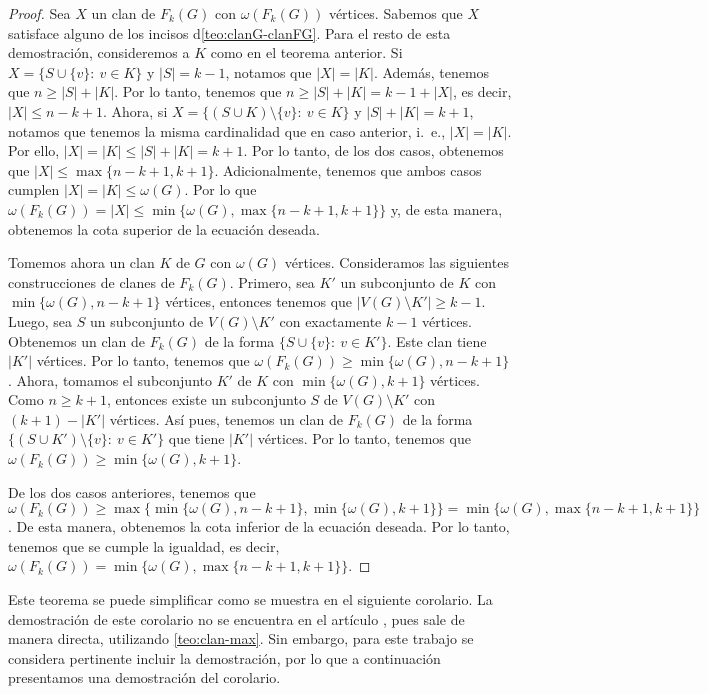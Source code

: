 \begin{proof}
    Sea $X$ un clan de $F_k(G)$ con $\omega(F_k(G))$ v\'ertices. Sabemos que $X$
    satisface alguno de los incisos d\cref{teo:clanG-clanFG}. Para el resto de
    esta demostraci\'on, consideremos a $K$ como en el teorema anterior.   Si $X
    = \{S \cup \{v\} \colon\ v \in K\}$ y $|S| = k-1$, notamos que $|X| = |K|$.
    Adem\'as, tenemos que $n \geq |S| + |K|$. Por lo tanto, tenemos que $n \geq
    |S| + |K| = k-1 + |X|$, es decir, $|X| \leq n-k+1$. Ahora, si $X = \{(S\cup
    K) \setminus \{v\} \colon\ v \in K \}$ y $|S| + |K| = k+1$, notamos que
    tenemos la misma cardinalidad que en caso anterior, i.~e., $|X| =|K|$. Por
    ello, $|X| = |K| \leq |S| + |K| = k+1$. Por lo tanto, de los dos casos,
    obtenemos que $|X| \leq \max\{n-k+1, k+1\}$. Adicionalmente, tenemos que
    ambos casos cumplen $|X| = |K| \leq \omega(G)$. Por lo que $\omega(F_k(G)) =
    |X| \leq \min \{\omega(G), \max \{n-k+1, k+1\}\}$ y, de esta manera,
    obtenemos la cota superior de la ecuaci\'on deseada.

    Tomemos ahora un clan $K$ de $G$ con $\omega(G)$ v\'ertices. Consideramos
    las siguientes construcciones de clanes de $F_k(G)$. Primero, sea $K'$ un
    subconjunto de $K$ con $\min\{\omega(G),n-k+1\}$ v\'ertices, entonces
    tenemos que $|V(G) \setminus K'| \geq k-1$. Luego, sea $S$ un subconjunto de
    $V(G) \setminus K'$ con exactamente $k-1$ v\'ertices. Obtenemos un clan de
    $F_k(G)$ de la forma $\{ S \cup \{v\} \colon\ v \in K'\}$. Este clan tiene
    $|K'|$ v\'ertices. Por lo tanto, tenemos que $\omega(F_k(G)) \geq \min
    \{\omega(G), n-k+1\}$. Ahora, tomamos el subconjunto $K'$ de $K$ con $\min
    \{ \omega(G), k+1\}$ v\'ertices. Como $n \geq k+1$, entonces existe un
    subconjunto $S$ de $V(G) \setminus K'$ con $(k+1)-|K'|$ v\'ertices. As\'i
    pues, tenemos un clan de $F_k(G)$ de la forma $\{ (S \cup K') \setminus
    \{v\} \colon\ v \in K'\}$ que tiene $|K'|$ v\'ertices. Por lo tanto, tenemos
    que $\omega(F_k(G)) \geq \min \{\omega(G), k+1\}$.

    De los dos casos anteriores, tenemos que $\omega(F_k(G)) \geq \max \{\min
    \{\omega(G), n-k+1\}, \min \{\omega(G), k+1 \}\} = \min \{\omega(G), \max
    \{n-k+1,k+1\}\}$. De esta manera, obtenemos la cota inferior de la
    ecuaci\'on deseada. Por lo tanto, tenemos que se cumple la igualdad, es
    decir, $\omega(F_k(G))= \min \{\omega(G), \max \{n-k+1,k+1\}\}$.
\end{proof}

Este teorema se puede simplificar como se muestra en el siguiente corolario. La
demostraci\'on de este corolario no se encuentra en el art\'iculo
\cite{fabilaToken}, pues sale de manera directa, utilizando \cref{teo:clan-max}.
Sin embargo, para este trabajo se considera pertinente incluir la
demostraci\'on, por lo que a continuaci\'on presentamos una demostraci\'on del
corolario.

